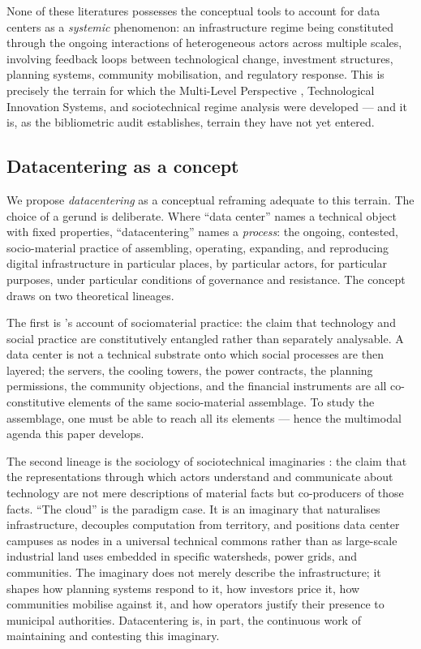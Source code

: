 None of these literatures possesses the conceptual tools to account for data centers as a \textit{systemic} phenomenon: an infrastructure regime being constituted through the ongoing interactions of heterogeneous actors across multiple scales, involving feedback loops between technological change, investment structures, planning systems, community mobilisation, and regulatory response. This is precisely the terrain for which the Multi-Level Perspective \citep{geels2002technological}, Technological Innovation Systems, and sociotechnical regime analysis were developed — and it is, as the bibliometric audit establishes, terrain they have not yet entered.

\subsection{Datacentering as a concept}

We propose \textit{datacentering} as a conceptual reframing adequate to this terrain. The choice of a gerund is deliberate. Where ``data center'' names a technical object with fixed properties, ``datacentering'' names a \textit{process}: the ongoing, contested, socio-material practice of assembling, operating, expanding, and reproducing digital infrastructure in particular places, by particular actors, for particular purposes, under particular conditions of governance and resistance. The concept draws on two theoretical lineages.

The first is \citeauthor{orlikowski2007sociomaterial}'s \citeyear{orlikowski2007sociomaterial} account of sociomaterial practice: the claim that technology and social practice are constitutively entangled rather than separately analysable. A data center is not a technical substrate onto which social processes are then layered; the servers, the cooling towers, the power contracts, the planning permissions, the community objections, and the financial instruments are all co-constitutive elements of the same socio-material assemblage. To study the assemblage, one must be able to reach all its elements — hence the multimodal agenda this paper develops.

The second lineage is the sociology of sociotechnical imaginaries \citep{jasanoff2015dreamscapes}: the claim that the representations through which actors understand and communicate about technology are not mere descriptions of material facts but co-producers of those facts. ``The cloud'' is the paradigm case. It is an imaginary that naturalises infrastructure, decouples computation from territory, and positions data center campuses as nodes in a universal technical commons rather than as large-scale industrial land uses embedded in specific watersheds, power grids, and communities. The imaginary does not merely describe the infrastructure; it shapes how planning systems respond to it, how investors price it, how communities mobilise against it, and how operators justify their presence to municipal authorities. Datacentering is, in part, the continuous work of maintaining and contesting this imaginary.

